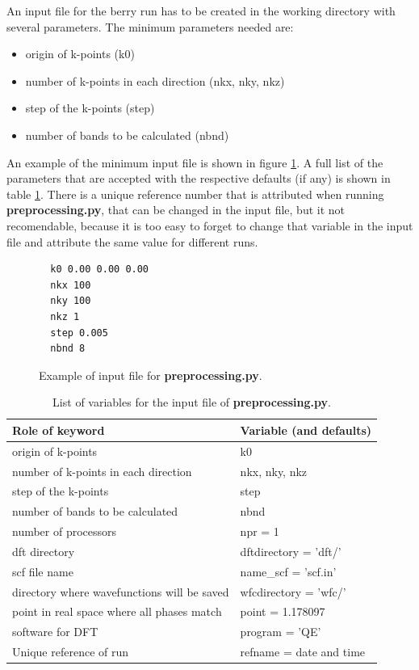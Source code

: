 \documentclass[a4paper,12pt]{report}
\begin{document}
 An input file for the berry run has to be created in the working directory with several parameters.
The minimum parameters needed are:
\begin{itemize}
 \item origin of k-points (k0)
 \item number of k-points in each direction (nkx, nky, nkz)
 \item step of the k-points (step)
 \item number of bands to be calculated (nbnd)
\end{itemize}

An example of the minimum input file is shown in figure \ref{code:inputfile}.
A full list of the parameters that are accepted with the respective defaults (if any)
is shown in table \ref{tab:variables_preprocessing}.
There is a unique reference number that is attributed when running \textbf{preprocessing.py},
that can be changed in the input file, but it not recomendable, because it is too easy to forget
to change that variable in the input file and attribute the same value for different runs.

\begin{figure}[h]
 \centering\caption{Example of input file for \textbf{preprocessing.py}.}
\begin{verbatim}
  k0 0.00 0.00 0.00
  nkx 100
  nky 100
  nkz 1
  step 0.005
  nbnd 8
\end{verbatim}
\label{code:inputfile}
\end{figure}



\begin{table}[h]
 \centering
 \caption{List of variables for the input file of \textbf{preprocessing.py}.}

 \begin{tabularx}{\textwidth}{Xl}
 \textbf{Role of keyword}  & \textbf{Variable (and defaults)}\\
\hline
 origin of k-points  & k0 \\
 number of k-points in each direction  & nkx, nky, nkz \\
 step of the k-points  & step \\
 number of bands to be calculated  & nbnd \\
 \hline
 number of processors  & npr = 1 \\
 dft directory  & dftdirectory = 'dft/' \\
 scf file name  &     name\_scf = 'scf.in' \\
 directory where wavefunctions will be saved  &     wfcdirectory = 'wfc/' \\
 point in real space where all phases match  & point = 1.178097 \\
 software for DFT  &  program = 'QE' \\
 Unique reference of run & refname = date and time \\
 \hline
\end{tabularx}
 \label{tab:variables_preprocessing}
\end{table}
\end{document}
